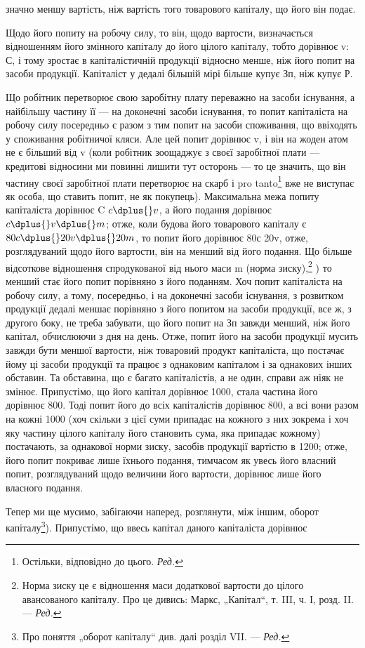 \parcont{}  %
значно меншу вартість, ніж вартість того товарового капіталу, що
його він подає.

Щодо його попиту на робочу силу, то він, щодо вартости, визначається
відношенням його змінного капіталу до його цілого капіталу,
тобто дорівнює v: С, і тому зростає в капіталістичній продукції
відносно менше, ніж його попит на засоби продукції. Капіталіст
у дедалі більшій мірі більше купує Зп, ніж купує Р.

Що робітник перетворює свою заробітну плату переважно на засоби
існування, а найбільшу частину її — на доконечні засоби існування, то попит
капіталіста на робочу силу посередньо є разом з тим попит на засоби споживання,
що ввіходять у споживання робітничої кляси. Але цей попит
дорівнює v, і він на жоден атом не є більший від v (коли робітник зоощаджує
з своєї заробітної плати — кредитові відносини ми повинні лишити
тут осторонь — то це значить, що він частину своєї заробітної плати
перетворює на скарб і pro tanto\footnote*{
Остільки, відповідно до цього. \emph{Ред.}
} вже не виступає як особа, що ставить
попит, не як покупець). Максимальна межа попиту капіталіста дорівнює
C \deq{} $c \dplus{} v$, а його подання дорівнює $c \dplus{} v \dplus{} m$; отже, коли будова
його товарового капіталу є $80c \dplus{} 20v \dplus{} 20m$, то попит його дорівнює
80с \dplus{} 20v, отже, розглядуваний щодо його вартости, він на  менший
від його подання. Що більше відсоткове відношення спродукованої від нього
маси m (норма зиску),\footnote*{Норма зиску це є відношення маси додаткової вартости до цілого авансованого
капіталу. Про це дивись: Маркс, „Капітал“, т. III, ч. І, розд. II. —
\emph{Ред.}}
) то менший стає його попит порівняно з його
поданням. Хоч попит капіталіста на робочу силу, а тому, посередньо, і
на доконечні засоби існування, з розвитком продукції дедалі меншає порівняно
з його попитом на засоби продукції, все ж, з другого боку, не
треба забувати, що його попит на Зп завжди менший, ніж його капітал,
обчислюючи з дня на день. Отже, попит його на засоби продукції
мусить завжди бути меншої вартости, ніж товаровий продукт капіталіста,
що постачає йому ці засоби продукції та працює з однаковим
капіталом і за однакових інших обставин. Та обставина, що є
багато капіталістів, а не один, справи аж ніяк не змінює. Припустімо,
що його капітал дорівнює 1000, стала частина його дорівнює
800. Тоді попит його до всіх капіталістів дорівнює 800,
а всі вони разом на кожні 1000 (хоч скільки з цієї суми припадає
на кожного з них зокрема і хоч яку частину цілого капіталу його
становить сума, яка припадає кожному) постачають, за однакової норми
зиску, засобів продукції вартістю в 1200; отже, його попит покриває
лише  їхнього подання, тимчасом як увесь його власний попит,
розглядуваний щодо величини його вартости, дорівнює лише 
його власного подання.

Тепер ми ще мусимо, забігаючи наперед, розглянути, між іншим, оборот
капіталу\footnote*{Про поняття „оборот капіталу“ див. далі розділ VII. — \emph{Ред.}}). Припустімо, що ввесь капітал даного капіталіста дорівнює
\parbreak{}  %
